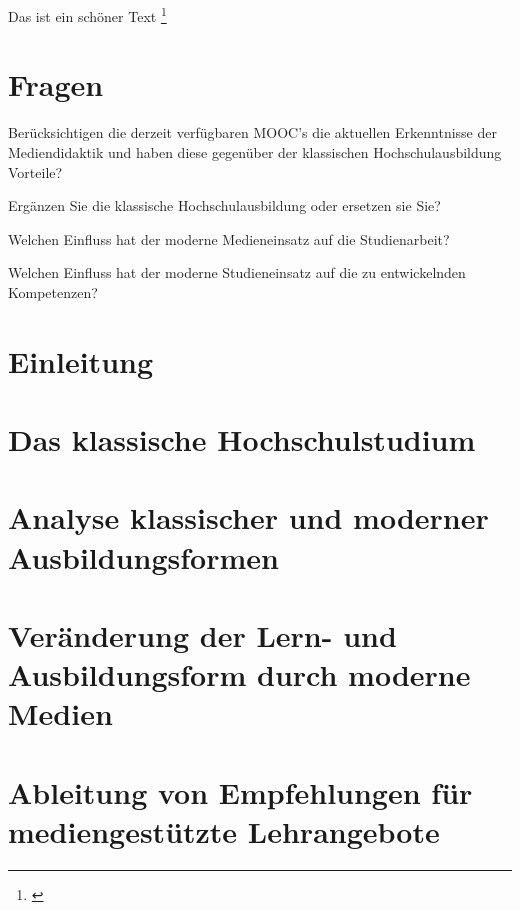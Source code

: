 \documentclass[150]{HSMW-Thesis}
\begin{document}



\begin{Referat}
\end{Referat}

\begin{Vorwort}
\end{Vorwort}

\Hauptteil

Das ist ein schöner Text  \footnote{\cite{Schulmeister2013}}

\chapter{Fragen}
Berücksichtigen die derzeit verfügbaren MOOC's die aktuellen Erkenntnisse der Mediendidaktik und haben diese gegenüber der klassischen Hochschulausbildung Vorteile?

Ergänzen Sie die klassische Hochschulausbildung oder ersetzen sie Sie?

Welchen Einfluss hat der moderne Medieneinsatz auf die Studienarbeit?

Welchen Einfluss hat der moderne Studieneinsatz auf die zu entwickelnden Kompetenzen?

\chapter{Einleitung}

\chapter{Das klassische Hochschulstudium}

\chapter{Analyse klassischer und moderner Ausbildungsformen}

\chapter{Veränderung der Lern- und Ausbildungsform durch moderne Medien}

\chapter{Ableitung von Empfehlungen für mediengestützte Lehrangebote}


\Anhang



\end{document}
